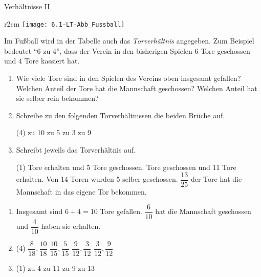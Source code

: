 \documentclass[lerntheke,12pt,a5paper,landscape]{arbeitsblatt}
\begin{document}
	\begin{karte2}[\iconPartner]{Verhältnisse II}
		\begin{wrapfix}
		\begin{wrapfigure}{r}{2cm}
			\texttt{[image: 6.1-LT-Abb\_Fussball]}
		\end{wrapfigure}
		Im Fußball wird in der Tabelle auch das \emph{Torverhältnis} angegeben. Zum Beispiel bedeutet \enquote{6 zu 4}, dass der Verein in den bisherigen Spielen $6$ Tore geschossen und $4$ Tore kassiert hat.
		\end{wrapfix}\vspace{-.8em}

		\begin{enumerate}\small
			\item Wie viele Tore sind in den Spielen des Vereins oben insgesamt gefallen? Welchen Anteil der Tore hat die Mannschaft geschossen? Welchen Anteil hat sie selber rein bekommen?
			\item Schreibe zu den folgenden Torverhältnissen die beiden Brüche auf.
				\begin{tasks}(4)
					 zu 10
					 zu 5
					 zu 3
					 zu 9
				\end{tasks}
			\item Schreibt jeweils das Torverhältnis auf.
				\begin{tasks}(1)
					 Tore erhalten und 5 Tore geschossen.
					 Tore geschossen und 11 Tore erhalten.
					\task Von 14 Toren wurden 5 selber geschossen.
					\task $\dfrac{13}{25}$ der Tore hat die Mannschaft in das eigene Tor bekommen.
				\end{tasks}
		\end{enumerate}
	\end{karte2}

	\begin{loesungskarte}
		\begin{enumerate}
			\item Insgesamt sind $6+4=10$ Tore gefallen. $\dfrac{6}{10}$ hat die Mannschaft geschossen und $\dfrac{4}{10}$ haben sie erhalten.

			\item\begin{tasks}(4)
				\task $\dfrac{8}{18}, \dfrac{10}{18}$
				\task $\dfrac{10}{15}, \dfrac{5}{15}$
				\task $\dfrac{9}{12}, \dfrac{3}{12}$
				\task $\dfrac{3}{12}, \dfrac{9}{12}$
			\end{tasks}

			\item\begin{tasks}(1)
				\task 5 zu 4
				\task 2 zu 11
				\task 5 zu 9
				\task 12 zu 13
			\end{tasks}
		\end{enumerate}
	\end{loesungskarte}
\end{document}

